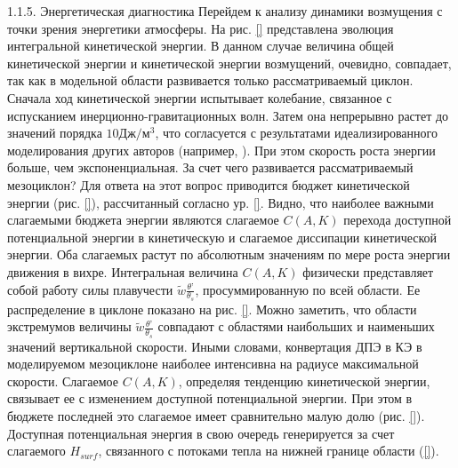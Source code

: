 1.1.5.	Энергетическая диагностика
Перейдем к анализу динамики возмущения с точки зрения энергетики атмосферы. На рис. \ref{} представлена эволюция интегральной кинетической энергии. В данном случае величина общей кинетической энергии и кинетической энергии возмущений, очевидно, совпадает, так как в модельной области развивается только рассматриваемый циклон. Сначала ход кинетической энергии испытывает колебание, связанное с испусканием инерционно-гравитационных волн. Затем она непрерывно растет до значений порядка $10 Дж/м^3$, что согласуется с результатами идеализированного моделирования других авторов (например, \cite{YanaseNiino2007}). При этом скорость роста энергии больше, чем экспоненциальная. 
За счет чего развивается рассматриваемый мезоциклон? Для ответа на этот вопрос приводится бюджет кинетической энергии (рис. \ref{}), рассчитанный согласно ур. \ref{}. Видно, что наиболее важными слагаемыми бюджета энергии являются слагаемое $C(A,K)$ перехода доступной потенциальной энергии в кинетическую и слагаемое диссипации кинетической энергии. Оба слагаемых растут по абсолютным значениям по мере роста энергии движения в вихре. 
Интегральная величина $C(A,K)$ физически представляет собой работу силы плавучести $\tilde{w}\frac{\theta’}{\theta_s}$, просуммированную по всей области. Ее распределение в циклоне показано на рис. \ref{}. Можно заметить, что области экстремумов величины $\tilde{w}\frac{\theta’}{\theta_s}$ совпадают с областями наибольших и наименьших значений вертикальной скорости. Иными словами, конвертация ДПЭ в КЭ в моделируемом мезоциклоне наиболее интенсивна на радиусе максимальной скорости.
Слагаемое $C(A,K)$, определяя тенденцию кинетической энергии, связывает ее с изменением доступной потенциальной энергии. При этом в бюджете последней это слагаемое имеет сравнительно малую долю (рис. \ref{}). Доступная потенциальная энергия в свою очередь генерируется за счет  слагаемого $H_{surf}$, связанного с потоками тепла на нижней границе области (\ref{}).

